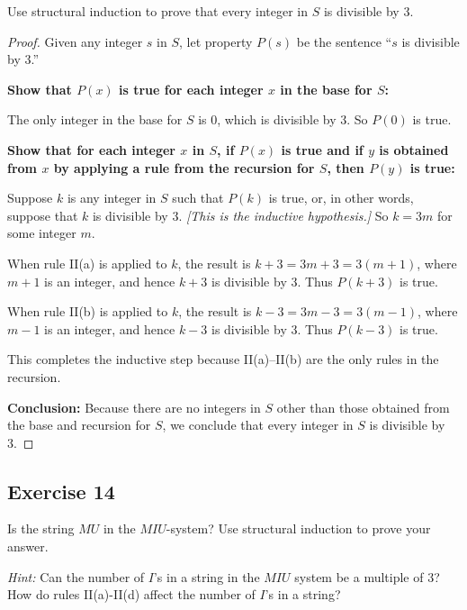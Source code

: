 \documentclass[14pt]{extarticle}
\begin{document}
Use structural induction to prove that every integer in $S$ is divisible by 3.

\begin{proof}
    Given any integer $s$ in $S$, let property $P(s)$ be the sentence “$s$ is divisible by 3.”

    {\bf Show that $P(x)$ is true for each integer $x$ in the base for $S$:}

    The only integer in the base for $S$ is 0, which is divisible by 3. So $P(0)$ is true.

        {\bf Show that for each integer $x$ in $S$, if $P(x)$ is true and if $y$ is obtained from $x$ by applying a rule
            from the recursion for $S$, then $P(y)$ is true:}

    Suppose $k$ is any integer in $S$ such that $P(k)$ is true, or, in other words, suppose that $k$ is divisible by 3.
        {\it [This is the inductive hypothesis.]} So $k = 3m$ for some integer $m$.

    When rule II(a) is applied to $k$, the result is $k+3 = 3m+3 = 3(m+1)$, where $m+1$ is an integer, and hence $k+3$
    is divisible by 3. Thus $P(k+3)$ is true.

    When rule II(b) is applied to $k$, the result is $k-3 = 3m-3 = 3(m-1)$, where $m-1$ is an integer, and hence $k-3$
    is divisible by 3. Thus $P(k-3)$ is true.

    This completes the inductive step because II(a)–II(b) are the only rules in the recursion.

        {\bf Conclusion:} Because there are no integers in $S$ other than those obtained from the base and recursion for
    $S$, we conclude that every integer in $S$ is divisible by 3.
\end{proof}

\subsection{Exercise 14}
Is the string $MU$ in the $M I U$-system? Use structural induction to prove your answer.

    {\it Hint:} Can the number of $I$’s in a string in the $M I U$ system be a multiple of 3? How do rules II(a)-II(d)
affect the number of $I$’s in a string?
\end{document}

